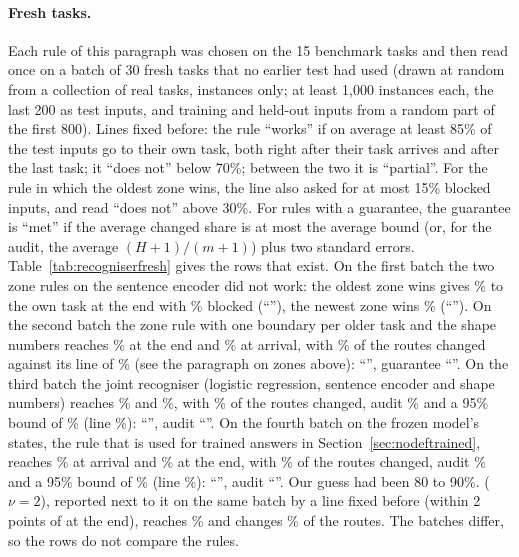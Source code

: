 \paragraph{Fresh tasks.} Each rule of this paragraph was chosen on the 15 benchmark tasks and then read once on a batch of 30 fresh tasks that no earlier test had used (drawn at random from a collection of real tasks, instances only; at least 1{,}000 instances each, the last 200 as test inputs, and training and held-out inputs from a random part of the first 800).
Lines fixed before: the rule ``works'' if on average at least 85\% of the test inputs go to their own task, both right after their task arrives and after the last task; it ``does not'' below 70\%; between the two it is ``partial''. For the rule in which the oldest zone wins, the line also asked for at most 15\% blocked inputs, and read ``does not'' above 30\%.
For rules with a guarantee, the guarantee is ``met'' if the average changed share is at most the average bound (or, for the audit, the average $(H{+}1)/(m{+}1)$) plus two standard errors.
Table~\ref{tab:recogniserfresh} gives the rows that exist.
On the first batch the two zone rules on the sentence encoder did not work: the oldest zone wins gives \AudShapeFreshFirstOldestEnd{}\% to the own task at the end with \AudShapeFreshFirstOldestBlocked{}\% blocked (``\AudShapeFreshFirstOldestUse{}''), the newest zone wins \AudShapeFreshFirstNewestEnd{}\% (``\AudShapeFreshFirstNewestUse{}'').
On the second batch the zone rule with one boundary per older task and the shape numbers reaches \AudShapeFreshSecondEnd{}\% at the end and \AudShapeFreshSecondArrive{}\% at arrival, with \AudShapeFreshSecondChanged{}\% of the routes changed against its line of \AudShapeFreshSecondBound{}\% (see the paragraph on zones above): ``\AudShapeFreshSecondUse{}'', guarantee ``\AudShapeFreshSecondGuarantee{}''.
On the third batch the joint recogniser (logistic regression, sentence encoder and shape numbers) reaches \AudFreshThirdArrive{}\% and \AudFreshThirdEnd{}\%, with \AudFreshThirdChanged{}\% of the routes changed, audit \AudFreshThirdAuditEst{}\% and a 95\% bound of \AudFreshThirdAuditBound{}\% (line \AudFreshThirdAuditLine{}\%): ``\AudFreshThirdUse{}'', audit ``\AudFreshThirdCert{}''.
On the fourth batch \recog{} on the frozen model's states, the rule that is used for trained answers in Section~\ref{sec:nodeftrained}, reaches \AudFreshFourthLArrive{}\% at arrival and \AudFreshFourthLEnd{}\% at the end, with \AudFreshFourthLChanged{}\% of the routes changed, audit \AudFreshFourthAuditEst{}\% and a 95\% bound of \AudFreshFourthAuditBound{}\% (line \AudFreshFourthLAuditLine{}\%): ``\AudFreshFourthUse{}'', audit ``\AudFreshFourthCert{}''.
Our guess had been 80 to 90\%.
\handicap{} ($\nu = 2$), reported next to it on the same batch by a line fixed before (within 2 points of \recog{} at the end), reaches \AudFreshFourthHEnd{}\% and changes \AudFreshFourthHChanged{}\% of the routes.
The batches differ, so the rows do not compare the rules.

